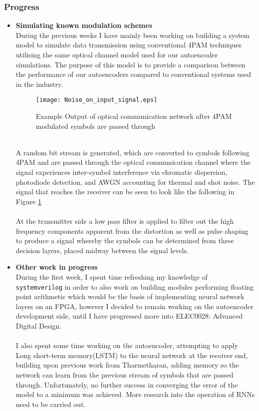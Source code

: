 \subsubsection{Progress}
\begin{itemize}
    \item \textbf{Simulating known modulation schemes}\\
    During the previous weeks I have mainly been working on building a system model to simulate data transmission using conventional 4PAM techniques utilising the same optical channel model used for our autoencoder simulations. The purpose of this model is to provide a comparison between the performance of our autoencoders compared to conventional systems used in the industry.
    \begin{figure}[H]
    	\centering
    	\texttt{[image: Noise\_on\_input\_signal.eps]}
    	\caption{Example Output of optical communication network after 4PAM modulated symbols are passed through}
    	\label{fig:output_signal}	
    \end{figure}
    \\
    A random bit stream is generated, which are converted to symbols following 4PAM and are passed through the optical communication channel where the signal experiences inter-symbol interference via chromatic dispersion, photodiode detection, and AWGN accounting for thermal and shot noise. The signal that reaches the receiver can be seen to look like the following in Figure \ref{fig:output_signal}
    \\
    \\
    At the transmitter side a low pass filter is applied to filter out the high frequency components apparent from the distortion as well as pulse shaping to produce a signal whereby the symbols can be determined from three decision layers, placed midway between the signal levels.
    
    \item \textbf{Other work in progress}\\
    During the first week, I spent time refreshing my knowledge of \texttt{systemverilog} in order to also work on building modules performing floating point arithmetic which would be the basis of implementing neural network layers on an FPGA, however I decided to remain working on the autoencoder development side, until I have progressed more into ELEC0028: Advanced Digital Design.
    \\
    \\
    I also spent some time working on the autoencoder, attempting to apply Long short-term memory(LSTM) to the neural network at the receiver end, building upon previous work from Tharmetharan, adding memory so the network can learn from the previous stream of symbols that are passed through. Unfortunately, no further success in converging the error of the model to a minimum was achieved. More research into the operation of RNNs need to be carried out.
\end{itemize}



